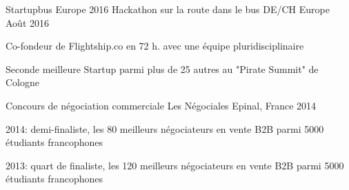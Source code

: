 

\begin{cventries}

  \cventry
    {Startupbus Europe 2016} %
    {Hackathon sur la route dans le bus DE/CH} %
    {Europe} %
    {Août 2016} %
    {
      \begin{cvitems} %
        \item {Co-fondeur de Flightship.co en 72 h. avec une équipe pluridisciplinaire}
        \item {Seconde meilleure Startup parmi plus de 25 autres au "Pirate Summit" de Cologne}
      \end{cvitems}
    }

  \cventry
    {Concours de négociation commerciale} %
    {Les Négociales} %
    {Epinal, France} %
    {2014} %
    {
    	\begin{cvitems}
      \item{2014: demi-finaliste, les 80 meilleurs négociateurs en vente B2B parmi 5000 étudiants francophones}
    	\item{2013: quart de finaliste, les 120 meilleurs négociateurs en vente B2B parmi 5000 étudiants francophones}
    	\end{cvitems}
    }
\end{cventries}


